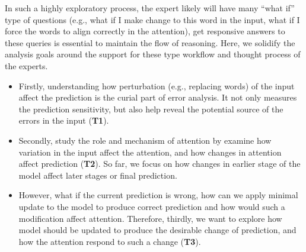 In such a highly exploratory process, the expert likely will have many ``what if'' type of questions (e.g., what if I make change to this word in the input, what if I force the words to align correctly in the attention), get responsive answers to these queries is essential to maintain the flow of reasoning.
%
Here, we solidify the analysis goals around the support for these type workflow and thought process of the experts.
%
\begin{itemize}
\item Firstly, understanding how perturbation (e.g., replacing words) of the input affect the prediction is the curial part of error analysis. It not only measures the prediction sensitivity, but also help reveal the potential source of the errors in the input (\textbf{T1}).

\item Secondly, study the role and mechanism of attention by examine how variation in the input affect the attention, and how changes in attention affect prediction (\textbf{T2}).
So far, we focus on how changes in earlier stage of the model affect later stages or final prediction.

\item However, what if the current prediction is wrong, how can we apply minimal update to the model to produce correct prediction and how would such a modification affect attention.
Therefore, thirdly, we want to explore how model should be updated to produce the desirable change of prediction, and how the attention respond to such a change (\textbf{T3}).
\end{itemize}
%



